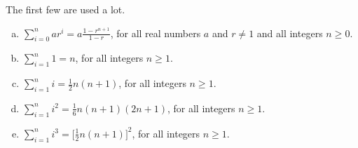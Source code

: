 The
first few are used a lot.
\begin{theorem}\label{thm:INTspecialSums}
\begin{enumerate}[(a)]
\item $\sum\limits_{i=0}^n ar^i = a\frac{1-r^{n+1}}{1-r}$, for all real numbers
$a$ and $r\ne 1$ and all integers $n\ge 0$.
\item $\sum\limits_{i=1}^n 1 = n$, for all integers $n\ge 1$.
\item $\sum\limits_{i=1}^n i = \frac{1}{2}n(n+1)$, for all integers $n\ge 1$.
\item $\sum\limits_{i=1}^n i^2 = \frac{1}{6}n(n+1)(2n+1)$, for all integers $n\ge 1$.
\item $\sum\limits_{i=1}^n i^3 = \Big[\frac{1}{2}n(n+1)\Big]^2$, for all integers $n\ge
1$.
\end{enumerate}
\end{theorem}
